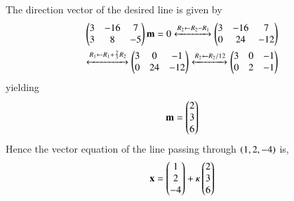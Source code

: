 The direction vector of the desired line 
is given by 
\begin{align*}
	\begin{pmatrix}3 & -16 & 7\\3 & 8 & -5\end{pmatrix}\mathbf{m} = 0
	\xleftrightarrow[]{R_2\leftarrow R_2-R_1}
 	\begin{pmatrix}3 & -16 & 7\\0 & 24 & -12\end{pmatrix}
	\\
	\xleftrightarrow[]{R_1\leftarrow R_1+\frac{2}{3}R_2}
	\begin{pmatrix}3 & 0 & -1\\0 & 24 & -12\end{pmatrix}
	\xleftrightarrow[]{R_2\leftarrow R_2/12}
	\begin{pmatrix}3 & 0 & -1\\0 & 2 & -1\end{pmatrix}
\end{align*}
yielding
\begin{align}
	\mathbf{m} = \begin{pmatrix}2\\3\\6\end{pmatrix}
\end{align}
Hence the vector equation of the line passing through $\left(1,2,-4\right)$ is,
\begin{align}
	\mathbf{x} = \begin{pmatrix}1\\2\\-4\end{pmatrix} + \kappa \begin{pmatrix}2\\3\\6\end{pmatrix}
\end{align}


